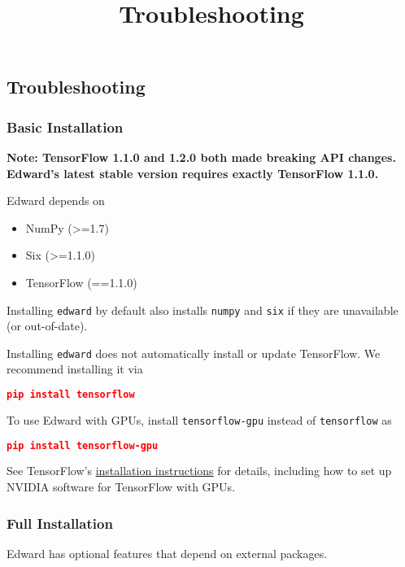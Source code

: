 \title{Troubleshooting}

\subsection{Troubleshooting}

\subsubsection{Basic Installation}

\textbf{Note:
TensorFlow 1.1.0 and 1.2.0 both made breaking API changes.
Edward's latest stable version requires exactly TensorFlow 1.1.0.
}

Edward depends on

\begin{itemize}
  \item NumPy (>=1.7)
  \item Six (>=1.1.0)
  \item TensorFlow (==1.1.0)
\end{itemize}

Installing \texttt{edward} by default also installs \texttt{numpy} and
\texttt{six} if they are unavailable (or out-of-date).

Installing \texttt{edward} does not automatically install or update
TensorFlow. We recommend installing it via

\begin{lstlisting}[language=JSON]
pip install tensorflow
\end{lstlisting}

To use Edward with GPUs, install \texttt{tensorflow-gpu} instead of
\texttt{tensorflow} as

\begin{lstlisting}[language=JSON]
pip install tensorflow-gpu
\end{lstlisting}

See TensorFlow's
\href{https://www.tensorflow.org/install/}{installation instructions}
for details, including how to set up NVIDIA software for TensorFlow with GPUs.

\subsubsection{Full Installation}

Edward has optional features that depend on external packages.

